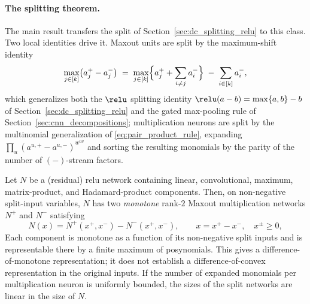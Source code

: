 \paragraph{The splitting theorem.}
The main result transfers the split of Section~\ref{sec:dc_splitting_relu} to this class. Two local identities drive it. Maxout units are split by the maximum-shift identity
\begin{equation}
	\max_{j \in [k]}\bigl(a_j^{+} - a_j^{-}\bigr)
	\;=\;
	\max_{j \in [k]}\Bigl\{a_j^{+} + \sum_{i \neq j} a_i^{-}\Bigr\}
	\;-\;
	\sum_{i \in [k]} a_i^{-},
	\label{eq:maxout_split_identity}
\end{equation}
which generalizes both the $\relu$ splitting identity $\relu(a - b) = \max\{a, b\} - b$ of Section~\ref{sec:dc_splitting_relu} and the gated max-pooling rule of Section~\ref{sec:cnn_decompositions}; multiplication neurons are split by the multinomial generalization of \eqref{eq:pair_product_rule}, expanding $\prod_u (a^{u,+} - a^{u,-})^{w^{uv}}$ and sorting the resulting monomials by the parity of the number of $(-)$-stream factors.

\begin{theoremenv}\label{thm:multiplicative_split}
Let $N$ be a (residual) \ac{relu} network containing linear, convolutional, maximum, matrix-product, and Hadamard-product components. Then, on non-negative split-input variables, $N$ has two \emph{monotone} rank-$2$ Maxout multiplication networks $N^{+}$ and $N^{-}$ satisfying
\begin{equation*}
	N(x) = N^{+}(x^+,x^-) - N^{-}(x^+,x^-), \qquad x=x^+-x^-,\quad x^\pm\ge0,
\end{equation*}
Each component is monotone as a function of its non-negative split inputs and is representable there by a finite maximum of posynomials. This gives a difference-of-monotone representation; it does not establish a difference-of-convex representation in the original inputs. If the number of expanded monomials per multiplication neuron is uniformly bounded, the sizes of the split networks are linear in the size of $N$.
\hfill{}
\end{theoremenv}

